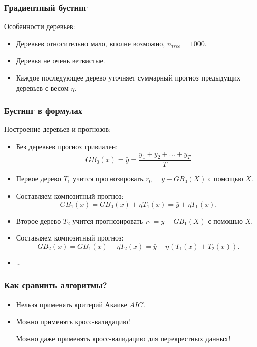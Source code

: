   \begin{frame}
    \frametitle{Градиентный бустинг}

    Особенности деревьев:
    \begin{itemize}[<+->]
      \item Деревьев относительно \alert{мало}, вполне возможно, $n_{tree} = 1000$.
      \item Деревья не очень \alert{ветвистые}.
      \item Каждое последующее дерево \alert{уточняет} суммарный прогноз предыдущих деревьев
      с весом $\eta$.
    \end{itemize}
  \end{frame}


  \begin{frame}
    \frametitle{Бустинг в формулах}
    Построение \alert{деревьев} и прогнозов:
    \begin{itemize}[<+->]
      \item Без деревьев прогноз тривиален: 
      \[
        GB_0(x) = \bar y = \frac{y_1 + y_2 + \ldots + y_T}{T}
      \]
      \item Первое дерево $T_1$ учится прогнозировать $r_0 = y - GB_0(X)$ с помощью $X$.
      \item Составляем композитный прогноз:
      \[
      GB_1(x) = GB_0(x) + \eta T_1(x) =\bar y + \eta T_1(x).  
      \]
  
      \item Второе дерево $T_2$ учится прогнозировать $r_1 = y - GB_1(X)$ с помощью  $X$.
      \item Составляем композитный прогноз:
      \[
      GB_2(x) = GB_1(x) + \eta T_2(x) =\bar y + \eta (T_1(x) + T_2(x)).  
      \]
      \item \ldots
  
    \end{itemize}
  \end{frame}

  
  \begin{frame}
    \frametitle{Как сравнить алгоритмы?}

    \begin{itemize}[<+->]
      \item Нельзя применять критерий Акаике $AIC$. 
      \item Можно применять \alert{кросс-валидацию}! 
      
      Можно даже применять \alert{кросс-валидацию} для \alert{перекрестных данных}!
    \end{itemize}
    
  
  \end{frame}



